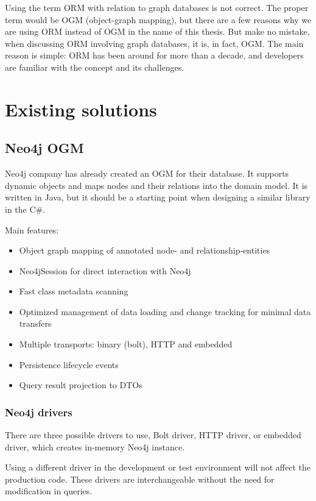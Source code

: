 Using the term ORM with relation to graph databases is not correct. The proper term would be OGM (object-graph mapping), but there are a few reasons why we are using ORM instead of OGM in the name of this thesis. But make no mistake, when discussing ORM involving graph databases, it is, in fact, OGM. The main reason is simple: ORM has been around for more than a decade, and developers are familiar with the concept and its challenges.

\section {Existing solutions}

\subsection {Neo4j OGM}

Neo4j company has already created an OGM for their database. It supports dynamic objects and maps nodes and their relations into the domain model. It is written in Java, but it should be a starting point when designing a similar library in the C\#.

\noindent Main features:
\begin{itemize}
    \item Object graph mapping of annotated node- and relationship-entities
    \item Neo4jSession for direct interaction with Neo4j
    \item Fast class metadata scanning
    \item Optimized management of data loading and change tracking for minimal data transfers
    \item Multiple transports: binary (bolt), HTTP and embedded
    \item Persistence lifecycle events
    \item Query result projection to DTOs
\end{itemize}

\subsubsection {Neo4j drivers}

There are three possible drivers to use, Bolt driver, HTTP driver, or embedded driver, which creates in-memory Neo4j instance.

Using a different driver in the development or test environment will not affect the production code. These drivers are interchangeable without the need for modification in queries.

